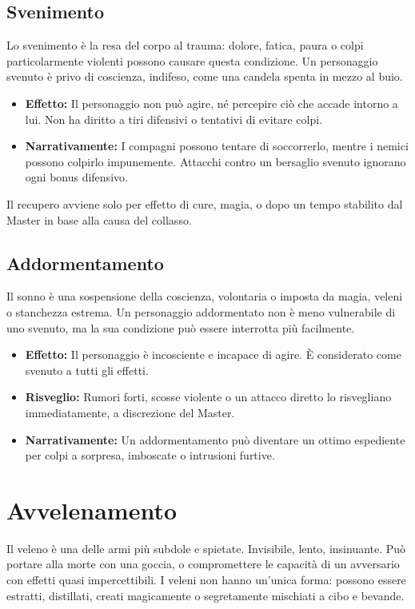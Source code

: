 \documentclass[../manuale_main.tex]{subfiles}
\begin{document}
\subsection{Svenimento}
Lo svenimento è la resa del corpo al trauma: dolore, fatica, paura o colpi particolarmente violenti possono causare questa condizione. Un personaggio svenuto è privo di coscienza, indifeso, come una candela spenta in mezzo al buio.

\begin{itemize}
\item \textbf{Effetto:} Il personaggio non può agire, né percepire ciò che accade intorno a lui. Non ha diritto a tiri difensivi o tentativi di evitare colpi.
\item \textbf{Narrativamente:} I compagni possono tentare di soccorrerlo, mentre i nemici possono colpirlo impunemente. Attacchi contro un bersaglio svenuto ignorano ogni bonus difensivo.
\end{itemize}

Il recupero avviene solo per effetto di cure, magia, o dopo un tempo stabilito dal Master in base alla causa del collasso.

\subsection{Addormentamento}
Il sonno è una sospensione della coscienza, volontaria o imposta da magia, veleni o stanchezza estrema. Un personaggio addormentato non è meno vulnerabile di uno svenuto, ma la sua condizione può essere interrotta più facilmente.

\begin{itemize}
\item \textbf{Effetto:} Il personaggio è incosciente e incapace di agire. È considerato come svenuto a tutti gli effetti.
\item \textbf{Risveglio:} Rumori forti, scosse violente o un attacco diretto lo risvegliano immediatamente, a discrezione del Master.
\item \textbf{Narrativamente:} Un addormentamento può diventare un ottimo espediente per colpi a sorpresa, imboscate o intrusioni furtive.
\end{itemize}
\clearpage
\section{Avvelenamento}

Il veleno è una delle armi più subdole e spietate. Invisibile, lento, insinuante. Può portare alla morte con una goccia, o compromettere le capacità di un avversario con effetti quasi impercettibili. I veleni non hanno un’unica forma: possono essere estratti, distillati, creati magicamente o segretamente mischiati a cibo e bevande.
\end{document}
